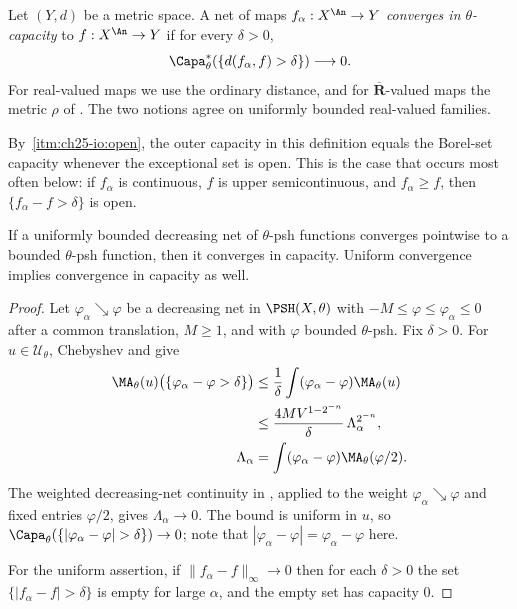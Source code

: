 \begin{definition}
\label{def:ch25-convergence-in-capacity}
Let $(Y,d)$ be a metric space.  A net of maps
$f_\alpha:X^{\An}\to Y$ \emph{converges in $\theta$-capacity} to
$f:X^{\An}\to Y$ if for every $\delta>0$,
\[
             \Capa^*_\theta(\{d(f_\alpha,f)>\delta\})\longrightarrow0.
\]
For real-valued maps we use the ordinary distance, and for
$\overline{\mathbf R}$-valued maps the metric $\rho$ of
.  The two notions agree on uniformly bounded
real-valued families.
\end{definition}

By \,\cref{itm:ch25-io:open}, the outer capacity
in this definition equals the Borel-set capacity whenever the exceptional
set is open.  This is the case that occurs most often below: if $f_\alpha$ is
continuous, $f$ is upper semicontinuous, and $f_\alpha\geq f$, then
$\{f_\alpha-f>\delta\}$ is open.

\begin{proposition}
\label{prop:decreasing-capacity-convergence}
If a uniformly bounded decreasing net of $\theta$-psh functions converges
pointwise to a bounded $\theta$-psh function, then it converges in
capacity. Uniform convergence implies convergence in capacity as well.
\end{proposition}

\begin{proof}
Let $\varphi_\alpha\searrow\varphi$ be a decreasing net in
$\PSH(X,\theta)$ with $-M\leq\varphi\leq\varphi_\alpha\leq0$ after a
common translation, $M\geq1$, and with $\varphi$ bounded
$\theta$-psh.  Fix $\delta>0$.  For $u\in\mathcal U_\theta$, Chebyshev
and  give
\[
 \begin{aligned}
 \MA_\theta(u)\bigl(\{\varphi_\alpha-\varphi>\delta\}\bigr)
 &\leq\frac1\delta\int(\varphi_\alpha-\varphi)\MA_\theta(u)\\
 &\leq\frac{4MV^{1-2^{-n}}}{\delta}\,\Lambda_\alpha^{2^{-n}},\\
 \Lambda_\alpha&=\int(\varphi_\alpha-\varphi)\MA_\theta(\varphi/2).
 \end{aligned}
\]
The weighted decreasing-net continuity in
, applied to the weight
$\varphi_\alpha\searrow\varphi$ and fixed entries $\varphi/2$, gives
$\Lambda_\alpha\to0$.  The bound is uniform in $u$, so
$\Capa_\theta(\{|\varphi_\alpha-\varphi|>\delta\})\to0$; note that
$|\varphi_\alpha-\varphi|=\varphi_\alpha-\varphi$ here.

For the uniform assertion, if $\|f_\alpha-f\|_\infty\to0$ then for each
$\delta>0$ the set $\{|f_\alpha-f|>\delta\}$ is empty for large
$\alpha$, and the empty set has capacity $0$.
\end{proof}

